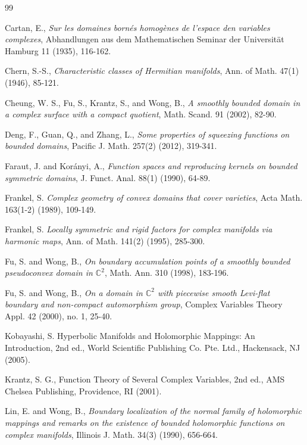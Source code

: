 \documentclass[12pt]{article}
\newcommand{\C}{\mathbb{C}}
\begin{document}
\begin{thebibliography}{99}

 Cartan, E., \textit{Sur les domaines born{\'e}s homog{\`e}nes de l’espace den variables complexes}, {Abhandlungen aus dem Mathematischen Seminar der Universit{\"a}t Hamburg} 11 (1935), 116-162.

 Chern, S.-S., \textit{Characteristic classes of Hermitian manifolds}, Ann. of Math. 47(1) (1946), 85-121.

 Cheung, W. S., Fu, S., Krantz, S., and Wong, B., \textit{A smoothly bounded domain in a complex surface with a compact quotient}, Math. Scand. 91 (2002), 82-90.

 Deng, F., Guan, Q., and Zhang, L., \textit{Some properties of squeezing functions on bounded domains}, Pacific J. Math. 257(2) (2012), 319-341.

 Faraut, J. and Kor\'anyi, A., \textit{Function spaces and reproducing kernels on bounded symmetric domains}, J. Funct. Anal. 88(1) (1990), 64-89.

 Frankel, S. \textit{Complex geometry of convex domains that cover varieties}, Acta Math. 163(1-2) (1989), 109-149.

 Frankel, S. \textit{Locally symmetric and rigid factors for complex manifolds via harmonic maps}, Ann. of Math. 141(2) (1995), 285-300.

 Fu, S. and Wong, B., \textit{On boundary accumulation points of a smoothly bounded pseudoconvex domain in $\C^2$}, Math. Ann. 310 (1998), 183-196.

 Fu, S. and Wong, B., \textit{On a domain in $\C^2$ with piecewise smooth Levi-flat boundary and non-compact automorphism group}, Complex Variables Theory Appl. 42 (2000), no. 1, 25-40.

 Kobayashi, S. Hyperbolic Manifolds and Holomorphic Mappings: An Introduction, 2nd ed., World Scientific Publishing Co. Pte. Ltd., Hackensack, NJ (2005).

 Krantz, S. G., Function Theory of Several Complex Variables, 2nd ed., AMS Chelsea Publishing, Providence, RI (2001). 

 Lin, E. and Wong, B., \textit{Boundary localization of the normal family of holomorphic mappings and remarks on the existence of bounded holomorphic functions on complex manifolds}, Illinois J. Math. 34(3) (1990), 656-664.


\end{thebibliography}
\end{document}
